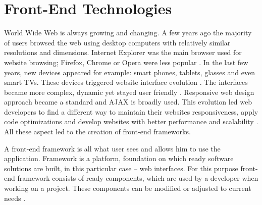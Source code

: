 \section{Front-End Technologies}
World Wide Web is always growing and changing. A few years ago the majority of users browsed the web using desktop computers with relatively similar resolutions and dimensions. Internet Explorer was the main browser used for website browsing; Firefox, Chrome or Opera were less popular \cite{FrontEndSKI}. In the last few years, new devices appeared for example: smart phones, tablets, glasses and even smart TVs. These devices triggered website interface evolution \cite{FrontEndSKI}. The interfaces became more complex, dynamic yet stayed user friendly \cite{FrontEndSKI}. Responsive web design approach became a standard and AJAX is broadly used. This evolution led web developers to find a different way to maintain their websites responsiveness, apply code optimizations and develop websites with better performance and scalability \cite{FrontEndSKI}. All these aspect led to the creation of front-end frameworks.

A front-end framework is all what user sees and allows him to use the application. Framework is a platform, foundation on which ready software solutions are built, in this particular case – web interfaces. For this purpose front-end framework consists of ready components, which are used by a developer when working on a project. These components can be modified or adjusted to current needs \cite{FrontEndSKI}.
